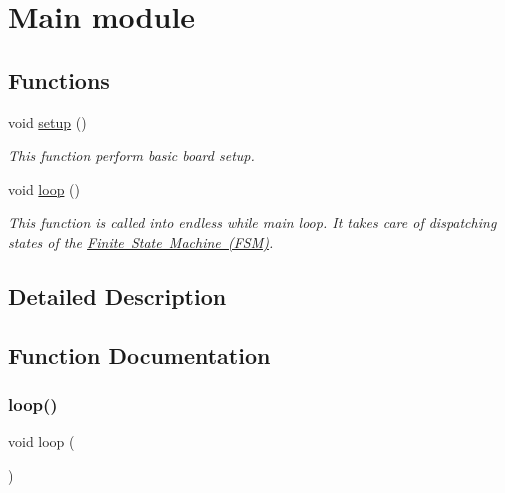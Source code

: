 \hypertarget{group___main__group__module}{}\section{Main module}
\label{group___main__group__module}
\subsection*{Functions}
\begin{DoxyCompactItemize}
\item 
void \mbox{\hyperlink{group___main__group__module_ga4fc01d736fe50cf5b977f755b675f11d}{setup}} ()
\begin{DoxyCompactList}\small\item\em This function perform basic board setup. \end{DoxyCompactList}\item 
void \mbox{\hyperlink{group___main__group__module_gafe461d27b9c48d5921c00d521181f12f}{loop}} ()
\begin{DoxyCompactList}\small\item\em This function is called into endless while main loop. It takes care of dispatching states of the \mbox{\hyperlink{_f_s_m_page}{Finite State Machine (F\+SM)}}. \end{DoxyCompactList}\end{DoxyCompactItemize}


\subsection{Detailed Description}


\subsection{Function Documentation}
\mbox{\label{group___main__group__module_gafe461d27b9c48d5921c00d521181f12f}} 
\subsubsection{\texorpdfstring{loop()}{loop()}}
{\footnotesize\ttfamily void loop (\begin{DoxyParamCaption}{ }\end{DoxyParamCaption})}



